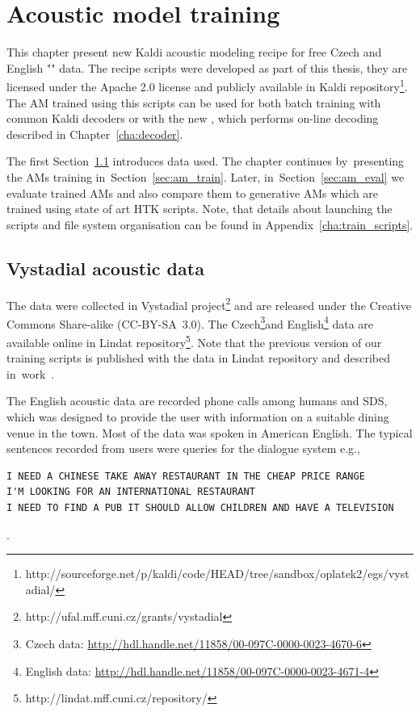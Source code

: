 \chapter{Acoustic model training}
\label{cha:train}

This chapter present new Kaldi acoustic modeling recipe for free Czech and English "" data.
The recipe scripts were developed as part of this thesis, they are licensed under the Apache 2.0 license and publicly available in Kaldi repository\footnote{http://sourceforge.net/p/kaldi/code/HEAD/tree/sandbox/oplatek2/egs/vystadial/}.
The \ac{AM} trained using this scripts can be used for both batch training with common Kaldi decoders or with the new , which performs on-line decoding described in Chapter~\ref{cha:decoder}.

The first Section~\ref{sec:data} introduces data used. 
The chapter continues by~presenting the \acp{AM} training in~Section~\ref{sec:am_train}. 
Later, in~Section~\ref{sec:am_eval} we evaluate trained \acp{AM} and also compare them to generative \acp{AM} which are trained using state of art \ac{HTK} scripts.
Note, that details about launching the scripts and file system organisation can be found in Appendix~\ref{cha:train_scripts}.  

\section{Vystadial acoustic data}
\label{sec:data}

The data were collected in Vystadial project\footnote{http://ufal.mff.cuni.cz/grants/vystadial} and are released under the Creative Commons Share-alike (CC-BY-SA~3.0). 
The Czech\footnote{Czech data: \url{http://hdl.handle.net/11858/00-097C-0000-0023-4670-6}}and English\footnote{English data: \url{http://hdl.handle.net/11858/00-097C-0000-0023-4671-4}} data are available online in Lindat repository\footnote{{http://lindat.mff.cuni.cz/repository/}}.
Note that the previous version of our training scripts is published with the data in Lindat repository and described in~work~\cite{korvas_2014}.

The English acoustic data are recorded phone calls among humans and \acl{SDS},
which was designed to provide the user with information on a suitable dining venue in the town.
Most of the data was spoken in American English.
The typical sentences recorded from users were queries for the dialogue system e.g.,
\begin{verbatim}
I NEED A CHINESE TAKE AWAY RESTAURANT IN THE CHEAP PRICE RANGE
I'M LOOKING FOR AN INTERNATIONAL RESTAURANT
I NEED TO FIND A PUB IT SHOULD ALLOW CHILDREN AND HAVE A TELEVISION
\end{verbatim}.

